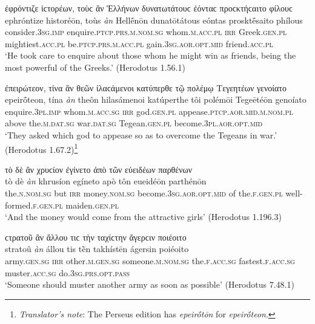 \begin{exe}
\ex ἐφρόντιζε ἱϲτορέων, τοὺϲ ἂν Ἑλλήνων δυνατωτάτουϲ ἐόνταϲ προϲκτήϲαιτο φίλουϲ\\
\gll ephróntize historéōn, toùs \emph{àn} Hellḗnōn dunatōtátous eóntas prosktḗsaito phílous\\
consider.\textsc{3sg.imp} enquire.\textsc{ptcp.prs.m.nom.sg} whom.\textsc{m.acc.pl} \textsc{irr} Greek.\textsc{gen.pl} mightiest.\textsc{acc.pl} be.\textsc{ptcp.prs.m.acc.pl} gain.\textsc{3sg.aor.opt.mid} friend.\textsc{acc.pl}\\
\trans `He took care to enquire about those whom he might win as friends, being the most powerful of the Greeks.' (Herodotus 1.56.1)
\label{wordgroup9}
\end{exe}

\begin{exe}
\ex ἐπειρώτεον, τίνα ἂν θεῶν ἱλαϲάμενοι κατύπερθε τῷ πολέμῳ Τεγεητέων γενοίατο\\
\gll epeirṓteon, tína \emph{àn} theôn hilasámenoi katúperthe tôi polémōi Tegeētéōn genoíato\\
enquire.\textsc{3pl.imp} whom.\textsc{m.acc.sg} \textsc{irr} god.\textsc{gen.pl} appease.\textsc{ptcp.aor.mid.m.nom.pl} above the.\textsc{m.dat.sg} war.\textsc{dat.sg} Tegean.\textsc{gen.pl} become.\textsc{3pl.aor.opt.mid}\\
\trans `They asked which god to appease so as to overcome the Tegeans in war.' (Herodotus 1.67.2)\footnote{\emph{Translator's note}: The Perseus edition has \textit{epeirṓtōn} for \textit{epeirṓteon}.}
\label{wordgroup10}
\end{exe}

\begin{exe}
\ex τὸ δὲ ἂν χρυϲίον ἐγίνετο ἀπὸ τῶν εὐειδέων παρθένων\\
\gll tò dè \emph{àn} khrusíon egíneto apò tôn eueidéōn parthénōn\\
the.\textsc{n.nom.sg} but \textsc{irr} money.\textsc{nom.sg} become.\textsc{3sg.aor.opt.mid} of the.\textsc{f.gen.pl} well-formed.\textsc{f.gen.pl} maiden.\textsc{gen.pl}\\
\trans `And the money would come from the attractive girls' (Herodotus 1.196.3)
\label{wordgroup11}
\end{exe}

\begin{exe}
\ex ϲτρατοῦ ἂν ἄλλου τιϲ τὴν ταχίϲτην ἄγερϲιν ποιέοιτο\\
\gll stratoû \emph{àn} állou tis tḕn takhístēn ágersin poiéoito\\
army.\textsc{gen.sg} \textsc{irr} other.\textsc{m.gen.sg} someone.\textsc{m.nom.sg} the.\textsc{f.acc.sg} fastest.\textsc{f.acc.sg} muster.\textsc{acc.sg} do.\textsc{3sg.prs.opt.pass}\\
\trans `Someone should muster another army as soon as possible' (Herodotus 7.48.1)
\label{wordgroup12}
\end{exe}

